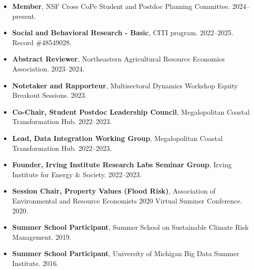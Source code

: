 \documentclass[10pt,oneside]{article}
\begin{document}
\begin{itemize}[label={}]
  
  \item \textbf{Member}, NSF Cross CoPe Student and Postdoc Planning Committee. 2024--present.
  
  \item \textbf{Social and Behavioral Research - Basic}, CITI program. 2022--2025.\\Record \#48549028.
  
  \item \textbf{Abstract Reviewer}, Northeastern Agricultural Resource Economics Association. 2023--2024.
  
  \item \textbf{Notetaker and Rapporteur}, Multisectoral Dynamics Workshop Equity Breakout Sessions. 2023.
  
  \item \textbf{Co-Chair, Student Postdoc Leadership Council}, Megalopolitan Coastal Transformation Hub. 2022--2023.
  
  \item \textbf{Lead, Data Integration Working Group}, Megalopolitan Coastal Transformation Hub. 2022--2023.
  
  \item \textbf{Founder, Irving Institute Research Labs Seminar Group}, Irving Institute for Energy \& Society. 2022--2023.
  
  \item \textbf{Session Chair, Property Values (Flood Risk)}, Association of Environmental and Resource Economists 2020 Virtual Summer Conference. 2020.
  
  \item \textbf{Summer School Participant}, Summer School on Sustainable Climate Risk Management. 2019.
  
  \item \textbf{Summer School Participant}, University of Michigan Big Data Summer Institute. 2016.
  
\end{itemize}
\end{document}
